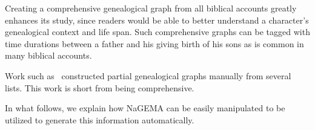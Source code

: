 \documentclass[11pt]{article}
\begin{document}
Creating a comprehensive genealogical graph from all biblical accounts greatly enhances its study,
since readers would be able to better understand a character's genealogical context and life span. Such comprehensive graphs can be tagged
with time durations between a father and his giving birth of his sons as is common in many biblical accounts. 

Work such as~\cite{Belote:Online,SoulLiberty:Online} constructed partial genealogical graphs manually from several lists.
This work is short from being comprehensive. 

In what follows, we explain how NaGEMA can be easily manipulated to be utilized 
to generate this information automatically.





\end{document}
